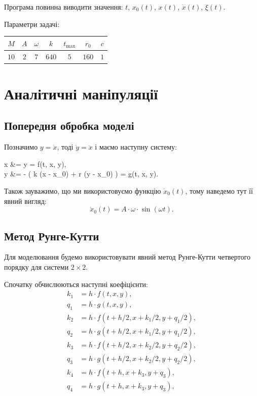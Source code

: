 Програма повинна виводити значення: $t$, $x_0(t)$, $x(t)$, $\dot x(t)$, $\xi(t)$. \medskip

Параметри задачі:
\begin{table}[H]
	\centering
	\begin{tabular}{|c|c|c|c|c|c|c|}
		\hline
		$M$ & $A$ & $\omega$ & $k$ & $t_{\text{max}}$ & $r_0$ & $c$ \\ \hline
		$10$ & $2$ & $7$ & $640$ & $5$ & $160$ & $1$ \\ \hline
	\end{tabular}
\end{table}


\section{Аналітичні маніпуляції}

\subsection{Попередня обробка моделі}

Позначимо $y = \dot x$, тоді $\dot y = \ddot x$ і маємо наступну систему:
\begin{system}
	\dot x &= y = f(t, x, y), \\
	\dot y &= -  \cdot \Big( k \cdot \big(x - x_0\big) + r \cdot \big(y - \dot x_0\big) \Big) = g(t, x, y).
\end{system}

Також зауважимо, що ми використовуємо функцію $\dot x_0(t)$, тому наведемо тут її явний вигляд:
\begin{equation}
	\dot x_0(t) = A \cdot \omega \cdot \sin(\omega t).
\end{equation}

\subsection{Метод Рунге-Кутти}

Для моделювання будемо використовувати явний метод Рунге-Кутти четвертого порядку для системи $2 \times 2$. \medskip

Спочатку обчислюються наступні коефіцієнти:
\begin{equation}
	\begin{aligned}
		k_1 &= h \cdot f(t, x, y), \\
		q_1 &= h \cdot g(t, x, y), \\
		k_2 &= h \cdot f(t + h / 2, x + k_1 / 2, y + q_1 / 2), \\
		q_2 &= h \cdot g(t + h / 2, x + k_1 / 2, y + q_1 / 2), \\
		k_3 &= h \cdot f(t + h / 2, x + k_2 / 2, y + q_2 / 2), \\
		q_3 &= h \cdot g(t + h / 2, x + k_2 / 2, y + q_2 / 2), \\
		k_4 &= h \cdot f(t + h, x + k_3, y + q_3), \\
		q_4 &= h \cdot g(t + h, x + k_3, y + q_3),
	\end{aligned}
\end{equation}

